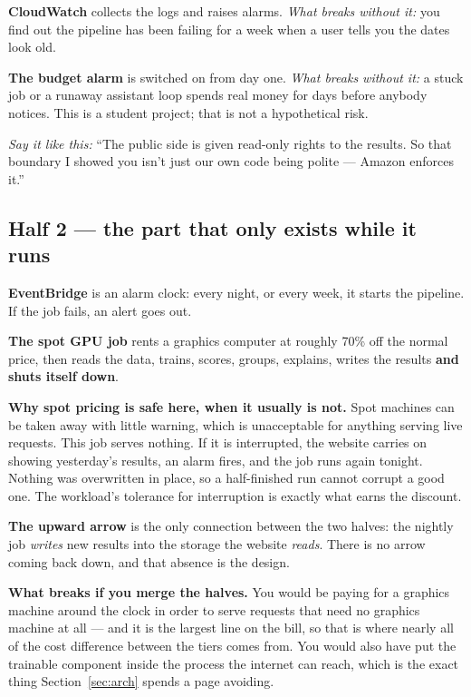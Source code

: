 \documentclass[11pt,a4paper]{article}
\newcommand{\aloud}[1]{\par\smallskip\noindent\textit{\textcolor{accent}{Say
it like this:}} ``#1''\par\smallskip}
\begin{document}
\textbf{CloudWatch} collects the logs and raises alarms. \emph{What breaks
without it:} you find out the pipeline has been failing for a week when a user
tells you the dates look old.

\textbf{The budget alarm} is switched on from day one. \emph{What breaks
without it:} a stuck job or a runaway assistant loop spends real money for days
before anybody notices. This is a student project; that is not a hypothetical
risk.

\aloud{The public side is given read-only rights to the results. So that
boundary I showed you isn't just our own code being polite --- Amazon enforces
it.}

\subsection{Half 2 --- the part that only exists while it runs}

\textbf{EventBridge} is an alarm clock: every night, or every week, it starts
the pipeline. If the job fails, an alert goes out.

\textbf{The spot GPU job} rents a graphics computer at roughly 70\% off the
normal price, then reads the data, trains, scores, groups, explains, writes the
results \textbf{and shuts itself down}.

\textbf{Why spot pricing is safe here, when it usually is not.} Spot machines
can be taken away with little warning, which is unacceptable for anything
serving live requests. This job serves nothing. If it is interrupted, the
website carries on showing yesterday's results, an alarm fires, and the job runs
again tonight. Nothing was overwritten in place, so a half-finished run cannot
corrupt a good one. The workload's tolerance for interruption is exactly what
earns the discount.

\textbf{The upward arrow} is the only connection between the two halves: the
nightly job \emph{writes} new results into the storage the website
\emph{reads}. There is no arrow coming back down, and that absence is the
design.

\textbf{What breaks if you merge the halves.} You would be paying for a
graphics machine around the clock in order to serve requests that need no
graphics machine at all --- and it is the largest line on the bill, so that is
where nearly all of the cost difference between the tiers comes from. You would
also have put the trainable component inside the process the internet can
reach, which is the exact thing Section~\ref{sec:arch} spends a page avoiding.
\end{document}
